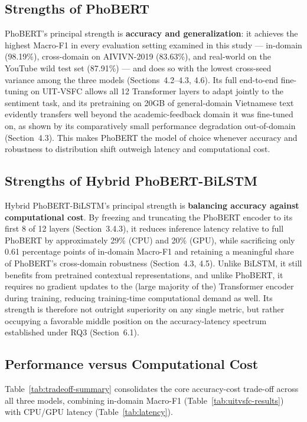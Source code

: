 \documentclass[12pt]{report} %
\begin{document}
\subsection{Strengths of PhoBERT}
PhoBERT's principal strength is \textbf{accuracy and generalization}: it achieves the highest Macro-F1 in every evaluation setting examined in this study --- in-domain (98.19\%), cross-domain on AIVIVN-2019 (83.63\%), and real-world on the YouTube wild test set (87.91\%) --- and does so with the lowest cross-seed variance among the three models (Sections~4.2--4.3, 4.6). Its full end-to-end fine-tuning on UIT-VSFC allows all 12 Transformer layers to adapt jointly to the sentiment task, and its pretraining on 20GB of general-domain Vietnamese text \cite{nguyen2020phobertpretrainedlanguagemodels} evidently transfers well beyond the academic-feedback domain it was fine-tuned on, as shown by its comparatively small performance degradation out-of-domain (Section~4.3). This makes PhoBERT the model of choice whenever accuracy and robustness to distribution shift outweigh latency and computational cost.

\subsection{Strengths of Hybrid PhoBERT-BiLSTM}
Hybrid PhoBERT-BiLSTM's principal strength is \textbf{balancing accuracy against computational cost}. By freezing and truncating the PhoBERT encoder to its first 8 of 12 layers (Section~3.4.3), it reduces inference latency relative to full PhoBERT by approximately 29\% (CPU) and 20\% (GPU), while sacrificing only 0.61 percentage points of in-domain Macro-F1 and retaining a meaningful share of PhoBERT's cross-domain robustness (Section~4.3, 4.5). Unlike BiLSTM, it still benefits from pretrained contextual representations, and unlike PhoBERT, it requires no gradient updates to the (large majority of the) Transformer encoder during training, reducing training-time computational demand as well. Its strength is therefore not outright superiority on any single metric, but rather occupying a favorable middle position on the accuracy-latency spectrum established under RQ3 (Section~6.1).



\subsection{Performance versus Computational Cost}
Table~\ref{tab:tradeoff-summary} consolidates the core accuracy-cost trade-off across all three models, combining in-domain Macro-F1 (Table~\ref{tab:uitvsfc-results}) with CPU/GPU latency (Table~\ref{tab:latency}).
\end{document}

